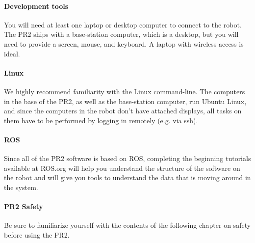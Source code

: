 \paragraph{Development tools}
You will need at least one laptop or desktop computer to connect to the robot.  The PR2 ships with a base-station computer, which is a desktop, but you will need to provide a screen, mouse, and keyboard.  A laptop with wireless access is ideal.
\paragraph{Linux} We highly recommend familiarity with the Linux command-line.  The computers in the base of the PR2, as well as the base-station computer, run Ubuntu Linux, and since the computers in the robot don't have attached displays, all tasks on them have to be performed by logging in remotely (e.g. via ssh).
\paragraph{ROS} Since all of the PR2 software is based on ROS, completing the beginning tutorials available at ROS.org will help you understand the structure of the software on the robot and will give you tools to understand the data that is moving around in the system.
\paragraph{PR2 Safety} Be sure to familiarize yourself with the contents of the following chapter on safety before using the PR2.
